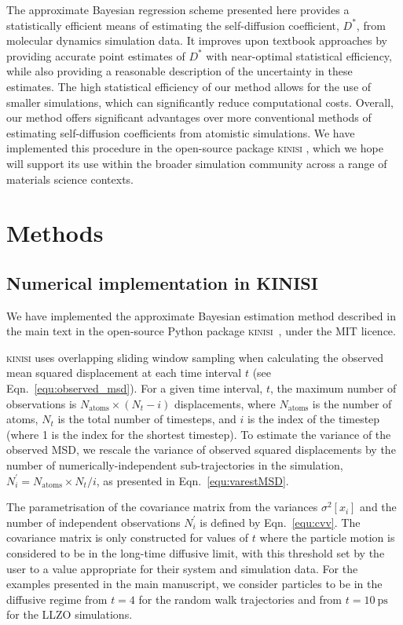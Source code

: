 \documentclass[reprint,superscriptaddress,nobibnotes,amsmath,amssymb,aps,prx,hidelinks,linenumbers]{revtex4-2}
\newcommand{\oMSDi}{\ensuremath{x_i}}
\newcommand{\nind}[1]{\ensuremath{N^\prime_{#1}}}
\newcommand{\D}{\ensuremath{D^*}}
\newcommand{\var}[1]{\ensuremath{\sigma^2[#1]}}
\begin{document}
The approximate Bayesian regression scheme presented here provides a statistically efficient means of estimating the self-diffusion coefficient, $\D$, from molecular dynamics simulation data.
It improves upon textbook approaches by providing accurate point estimates of $\D$ with near-optimal statistical efficiency, while also providing a reasonable description of the uncertainty in these estimates.
The high statistical efficiency of our method allows for the use of smaller simulations, which can significantly reduce computational costs.
Overall, our method offers significant advantages over more conventional methods of estimating self-diffusion coefficients from atomistic simulations.
We have implemented this procedure in the open-source package \textsc{kinisi} \cite{mccluskey_kinisi_2022}, which we hope will support its use within the broader simulation community across a range of materials science contexts.

\section{Methods}

\subsection{Numerical implementation in KINISI}
\label{sec:implementation}
We have implemented the approximate Bayesian estimation method described in the main text in the open-source Python package \textsc{kinisi}~\cite{mccluskey_kinisi_2022}, under the MIT licence. 

\textsc{kinisi} uses overlapping sliding window sampling when calculating the observed mean squared displacement at each time interval $t$ (see Eqn.~\ref{equ:observed_msd}).
For a given time interval, $t$, the maximum number of observations is $N_{\mathrm{atoms}} \times (N_{t} - i)$ displacements, where $N_{\mathrm{atoms}}$ is the number of atoms, $N_{t}$ is the total number of timesteps, and $i$ is the index of the timestep (where \num{1} is the index for the shortest timestep).
To estimate the variance of the observed MSD, we rescale the variance of observed squared displacements by the number of numerically-independent sub-trajectories in the simulation, $\nind{i} = N_{\mathrm{atoms}} \times N_{t} / i$, as presented in Eqn.~\ref{equ:varestMSD}.  

The parametrisation of the covariance matrix from the variances $\var{\oMSDi}$ and the number of independent observations $\nind{i}$ is defined by Eqn.~\ref{equ:cvv}. 
The covariance matrix is only constructed for values of $t$ where the particle motion is considered to be in the long-time diffusive limit, with this threshold set by the user to a value appropriate for their system and simulation data. 
For the examples presented in the main manuscript, we consider particles to be in the diffusive regime from $t=\num{4}$ for the random walk trajectories and from $t=\SI{10}{\pico\second}$ for the LLZO simulations.
\end{document}
